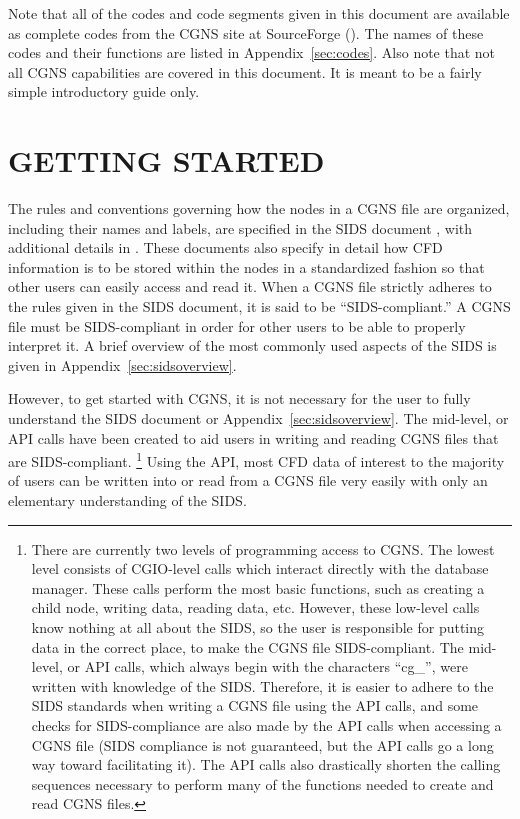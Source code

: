 \documentclass[12pt]{article}
\begin{document}
Note that all of the codes and code segments given in this document are
available as complete codes from the CGNS site at SourceForge
().
The names of these codes and their functions are listed in
Appendix~\ref{sec:codes}.  Also note that not all CGNS capabilities
are covered in this document.  It is meant to be a fairly simple
introductory guide only. 

\newpage
\section{GETTING STARTED} \label{sec:start}

The rules and conventions governing how the nodes in a CGNS 
file are organized, including their names and labels, are 
specified in the SIDS
document \cite{ALLMARAS}, with additional details in \cite{CGNS2}.
These documents also specify in detail how CFD information
is to be stored within the nodes in a standardized fashion so that 
other users can easily access and read it.
When a CGNS file strictly adheres to the rules given in
the SIDS document, it is said to be
``SIDS-compliant.''  A CGNS file must be SIDS-compliant in
order for other users to be able to properly interpret it.
A brief overview of the most commonly used aspects of the SIDS is given 
in Appendix~\ref{sec:sidsoverview}.

However, to get started with CGNS, it is not necessary
for the user to fully understand the SIDS document or Appendix~\ref{sec:sidsoverview}.  
The mid-level, or API calls have been created to aid users
in writing and reading CGNS files that are SIDS-compliant.  
\footnote{There are currently two levels of programming access to CGNS.
The lowest level consists of CGIO-level calls which interact directly
with the database manager. These calls
perform the most basic functions, such as creating a child node,
writing data, reading data, etc.
However, these low-level calls know nothing at all about the SIDS,
so the user is responsible for putting data in the correct 
place, to make the CGNS file SIDS-compliant.
The mid-level, or API calls, which always begin with the characters
``cg\_'', were written with knowledge of the SIDS.
Therefore, it is easier to adhere to the SIDS standards when
writing a CGNS file using the API calls, and some checks for
SIDS-compliance are also made by the API calls when accessing a CGNS file
(SIDS compliance is not guaranteed, but the API calls
go a long way toward facilitating it).  The API calls also
drastically shorten the calling sequences necessary to perform
many of the functions needed to create and read CGNS files.}
Using the API, most CFD data of interest to the majority of users can be
written into or read from a CGNS file very easily with only an
elementary understanding of the SIDS.
\end{document}
